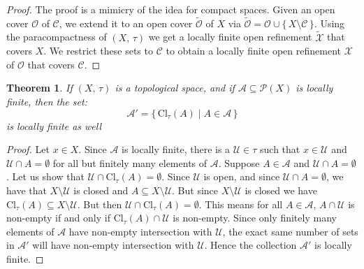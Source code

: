\documentclass{article}
\theoremstyle{plain}
\newtheorem{theorem}{Theorem}[section]
\theoremstyle{normal}
\begin{document}
        \begin{proof}
            The proof is a mimicry of the idea for compact spaces. Given an
            open cover $\mathcal{O}$ of $\mathcal{C}$, we extend it to an open
            cover $\tilde{\mathcal{O}}$ of $X$ via
            $\tilde{\mathcal{O}}=\mathcal{O}\cup\{\,X\setminus\mathcal{C}\,\}$.
            Using the paracompactness of $(X,\,\tau)$
            we get a locally finite open
            refinement $\tilde{\mathcal{X}}$ that covers $X$. We restrict these
            sets to $\mathcal{C}$ to obtain a locally finite open refinement
            $\mathcal{X}$ of $\mathcal{O}$ that covers $\mathcal{C}$.
        \end{proof}
        \begin{theorem}
            If $(X,\,\tau)$ is a topological space, and if
            $\mathcal{A}\subseteq\mathcal{P}(X)$ is locally finite, then the
            set:
            \begin{equation}
                \mathcal{A}'=\{\,\textrm{Cl}_{\tau}(A)\;|\;A\in\mathcal{A}\,\}
            \end{equation}
            is locally finite as well
        \end{theorem}
        \begin{proof}
            Let $x\in{X}$. Since $\mathcal{A}$ is locally finite, there is
            a $\mathcal{U}\in\tau$ such that $x\in\mathcal{U}$ and
            $\mathcal{U}\cap{A}=\emptyset$ for all but finitely many
            elements of $\mathcal{A}$. Suppose $A\in\mathcal{A}$ and
            $\mathcal{U}\cap{A}=\emptyset$. Let us show that
            $\mathcal{U}\cap\textrm{Cl}_{\tau}(A)=\emptyset$. Since
            $\mathcal{U}$ is open, and since $\mathcal{U}\cap{A}=\emptyset$,
            we have that $X\setminus\mathcal{U}$ is closed and
            $A\subseteq{X}\setminus\mathcal{U}$. But since
            $X\setminus\mathcal{U}$ is closed we have
            $\textrm{Cl}_{\tau}(A)\subseteq{X}\setminus\mathcal{U}$. But then
            $\mathcal{U}\cap\textrm{Cl}_{\tau}(A)=\emptyset$. This means
            for all $A\in\mathcal{A}$, $A\cap\mathcal{U}$ is non-empty
            if and only if $\textrm{Cl}_{\tau}(A)\cap\mathcal{U}$ is non-empty.
            Since only finitely many elements of $\mathcal{A}$ have non-empty
            intersection with $\mathcal{U}$, the exact same number of sets
            in $\mathcal{A}'$ will have non-empty intersection with
            $\mathcal{U}$. Hence the collection $\mathcal{A}'$ is locally
            finite.
        \end{proof}
\end{document}
